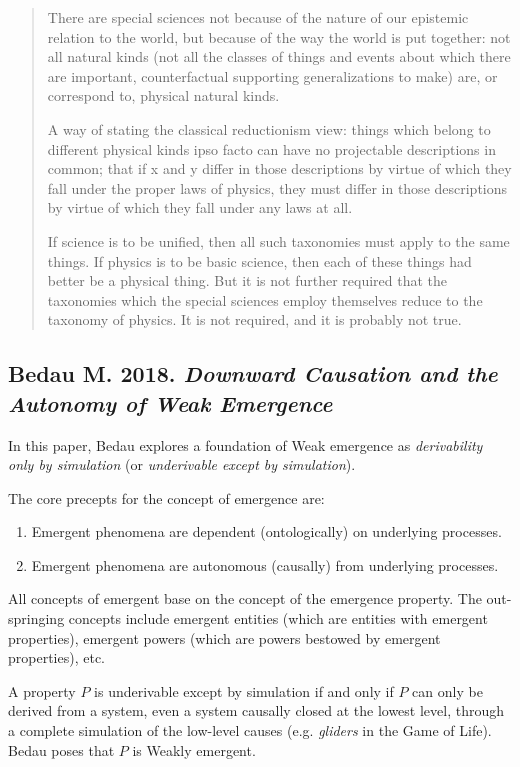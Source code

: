 \documentclass{article}
\newcommand{\ti}[1]{\textit{#1}}
\newcommand{\annbibtitle}[2]{\subsection*{#1. \ti{#2}}}
\begin{document}
\begin{quote}
There are special sciences not because of the nature of our epistemic relation to the world, but because of the way the world is put together: not all natural kinds (not all the classes of things and events about which there are important, counterfactual supporting generalizations to make) are, or correspond to, physical natural kinds.

A way of stating the classical reductionism view: things which belong to different physical kinds ipso facto can have no projectable descriptions in common; that if x and y differ in those descriptions by virtue of which they fall under the proper laws of physics, they must differ in those descriptions by virtue of which they fall under any laws at all.

If science is to be unified, then all such taxonomies must apply to the same things. If physics is to be basic science, then each of these things had better be a physical thing. But it is not further required that the taxonomies which the special sciences employ themselves reduce to the taxonomy of physics. It is not required, and it is probably not true.
\end{quote}

\annbibtitle{Bedau M. 2018}{Downward Causation and the Autonomy of Weak Emergence}

In this paper, Bedau explores a foundation of Weak emergence as \ti{derivability only by simulation} (or \ti{underivable except by simulation}).

The core precepts for the concept of emergence are:
\begin{enumerate}
    \item Emergent phenomena are dependent (ontologically) on underlying processes.
    \item Emergent phenomena are autonomous (causally) from underlying processes.
\end{enumerate}

All concepts of emergent base on the concept of the emergence property. The out-springing concepts include emergent entities (which are entities with emergent properties), emergent powers (which are powers bestowed by emergent properties), etc.

A property $P$ is underivable except by simulation if and only if $P$ can only be derived from a system, even a system causally closed at the lowest level, through a complete simulation of the low-level causes (e.g. \ti{gliders} in the Game of Life). Bedau poses that $P$ is Weakly emergent.
\end{document}
